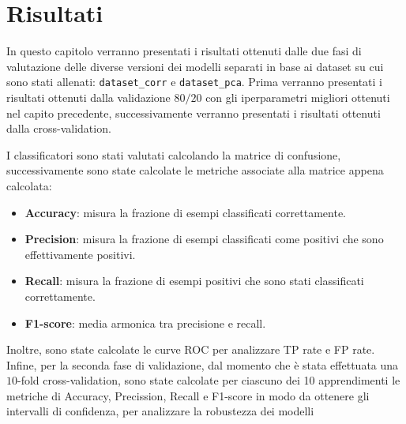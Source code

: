 \chapter{Risultati} \label{chp:risultati}
In questo capitolo verranno presentati i risultati ottenuti dalle due fasi di valutazione
delle diverse versioni dei modelli separati in base ai dataset su cui sono stati 
allenati: \texttt{dataset\_corr} e \texttt{dataset\_pca}. Prima verranno presentati
i risultati ottenuti dalla validazione $80/20$ con gli iperparametri migliori 
ottenuti nel capito precedente, successivamente verranno presentati
i risultati ottenuti dalla cross-validation.



I classificatori sono stati valutati calcolando la matrice di confusione, successivamente
sono state calcolate le metriche associate alla matrice appena calcolata:
\begin{itemize}
    \item \textbf{Accuracy}: misura la frazione di esempi classificati correttamente.
    \item \textbf{Precision}: misura la frazione di esempi classificati come
          positivi che sono effettivamente positivi.
    \item \textbf{Recall}: misura la frazione di esempi positivi che sono stati
          classificati correttamente.
    \item \textbf{F1-score}: media armonica tra precisione e recall.
\end{itemize}
Inoltre, sono state calcolate le curve ROC per analizzare TP rate e FP rate.
Infine, per la seconda fase di validazione, dal momento che è stata effettuata una 
$10$-fold cross-validation, sono state calcolate per ciascuno dei 10 apprendimenti
le metriche di Accuracy, Precission, Recall e F1-score in modo da ottenere gli 
intervalli di confidenza, per analizzare la robustezza dei modelli 

